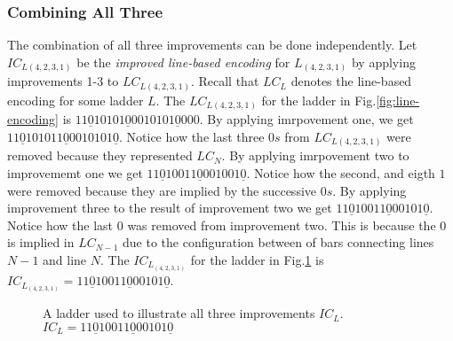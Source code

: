 \subsubsection{Combining All Three}
The combination of all three improvements can be done independently. 
Let $IC_{L(4,2,3,1)}$ be the \emph{improved line-based encoding} for $L_{(4,2,3,1)}$ 
by applying improvements 1-3 to $LC_{L(4,2,3,1)}$. Recall that $LC_{L}$ denotes the line-based encoding for some ladder $L$.
The $LC_{L(4,2,3,1)}$ for the ladder in Fig.\ref{fig:line-encoding} is $11\underline{0}10101\underline{0}0010101\underline{0}000$.
By applying imrpovement one, we get $11\underline{0}101011\underline{0}0010101\underline{0}$. 
Notice how the last three $0s$ from $LC_{L(4,2,3,1)}$ were removed because they represented $LC_{N}$.
By applying imrpovement two to improvememt one we get $11\underline{0}10011\underline{0}001001\underline{0}$.
Notice how the second, and eigth $1$ were removed because they are implied by 
the successive $0s$. By applying improvement three to the result of improvement 
two we get $11\underline{0}10011\underline{0}00101\underline{0}$. Notice how the last $0$ 
was removed from improvement two. This is because the $0$ is implied in $LC_{N-1}$
due to the configuration between of bars connecting lines $N-1$ and line $N$. The $IC_{L_(4,2,3,1)}$ for the ladder in Fig.\ref{Fig:allthree} 
is $IC_{L_(4,2,3,1)}=11\underline{0}10011\underline{0}00101\underline{0}$.\pagebreak

\begin{figure}[!htp]
     \centering
     \caption{A ladder used to illustrate all three improvements $IC_{L}$. $IC_{L}=11\underline{0}10011\underline{0}00101\underline{0}$}
     \label{Fig:allthree}
\end{figure}